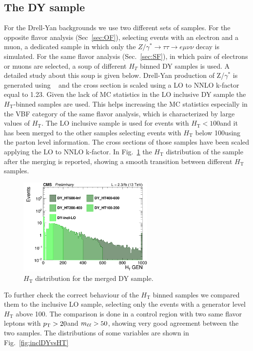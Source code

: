 \subsection*{The DY sample}\label{sec:DY}
For the Drell-Yan backgrounds we use two different sets of samples. 
For the opposite flavor analysis (Sec~\ref{sec:OF}), selecting events with an
electron and a muon, a dedicated sample in which only the
$Z/\gamma^{*}\rightarrow{}\tau\tau\rightarrow{e\mu\nu\nu}$ decay is simulated.
For the same flavor analysis (Sec.~\ref{sec:SF}), in which pairs of electrons
or muons are selected, a soup of different $H_T$ binned DY samples is used. A
detailed study about this soup is given below.
Drell-Yan production of Z/$\gamma^{*}$ is generated using \MADGRAPH~\cite{Alwall:2014hca} and the cross section is scaled using a LO to NNLO k-factor equal to 1.23. 
Given the lack of MC statistics in the LO inclusive DY sample the
$H_\mathrm{T}$-binned samples are used. This helps increasing the MC
statistics especially in the VBF category of the same flavor analysis, which is characterized by large values of $H_\mathrm{T}$.
The LO inclusive sample is used for events with $H_\mathrm{T} < 100$\GeV and it has been merged to the other samples selecting events with $H_\mathrm{T}$ below 100\GeV using the parton level information. The cross sections of those samples have been scaled applying the LO to NNLO k-factor. In Fig.~\ref{fig:DY_HT} the $H_\mathrm{T}$ distribution of the sample after the merging is reported, showing a smooth transition between different $H_\mathrm{T}$ samples.
\begin{figure}[htbp]
\centering
\includegraphics[width=0.6\textwidth]{../AN/Figs/log_c_incl_HTGen.png}
\caption{
    $H_\mathrm{T}$ distribution for the merged DY sample.}
    \label{fig:DY_HT}
\end{figure}
To further check the correct behaviour of the $H_\mathrm{T}$ binned samples we compared them to the inclusive LO sample, selecting only the events with a generator level $H_\mathrm{T}$ above 100\GeV. The comparison is done in a control region with two same flavor leptons with $p_{\mathrm{T}} > 20$\GeV and $m_{\ell\ell} > 50$\GeV, showing very good agreement between the two samples. The distributions of some variables are shown in Fig.~\ref{fig:inclDYvsHT}
